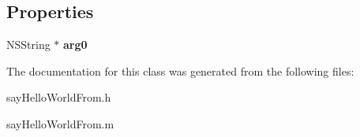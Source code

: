 \subsection*{Properties}
\begin{DoxyCompactItemize}
\item 
\hypertarget{interfacesay_hello_world_from_a6303d71d32e3829de85e5bcab539bca0}{}N\+S\+String $\ast$ {\bfseries arg0}\label{interfacesay_hello_world_from_a6303d71d32e3829de85e5bcab539bca0}

\end{DoxyCompactItemize}


The documentation for this class was generated from the following files\+:\begin{DoxyCompactItemize}
\item 
say\+Hello\+World\+From.\+h\item 
say\+Hello\+World\+From.\+m\end{DoxyCompactItemize}
